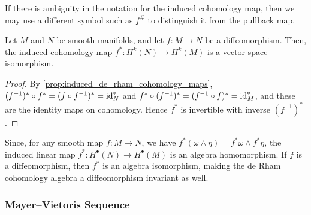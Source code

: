 \documentclass[a4paper,12pt]{article}
\begin{document}
\begin{remark}
    If there is ambiguity in the notation for the induced cohomology map, then we may use a different symbol such as $f^\#$ to distinguish it from the pullback map.
\end{remark}
\begin{corollary}\label{cor:de_rham_cohomology_diffeomorphism_invariance}
    Let $M$ and $N$ be smooth manifolds, and let $f \colon M \to N$ be a diffeomorphism.
    Then, the induced cohomology map $f^* \colon H^k(N) \to H^k(M)$ is a vector-space isomorphism.
\end{corollary}
\begin{proof}
    By \cref{prop:induced_de_rham_cohomology_maps}, $(f^{-1})^* \circ f^* = (f \circ f^{-1})^* = \operatorname{id}_N^*$ and $f^* \circ (f^{-1})^* = (f^{-1} \circ f)^* = \operatorname{id}_M^*$, and these are the identity maps on cohomology.
    Hence $f^*$ is invertible with inverse $(f^{-1})^*$.
\end{proof}
Since, for any smooth map $f \colon M \to N$, we have $f^*(\omega \wedge \eta) = f^*\omega \wedge f^*\eta$, the induced linear map $f^* \colon H^\bullet(N) \to H^\bullet(M)$ is an algebra homomorphism.
If $f$ is a diffeomorphism, then $f^*$ is an algebra isomorphism, making the de Rham cohomology algebra a diffeomorphism invariant as well.

\subsubsection{Mayer--Vietoris Sequence}\label{subsubsec:de_rham_theory:de_rham_cohomology:mayer--vietoris_sequence}
\end{document}
